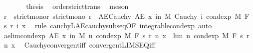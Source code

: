 \begin{isabellebody}
\isanewline
\ \ \ \ \isamarkupfalse%
\ \isamarkupfalse%
\ {\isacharquery}{\kern0pt}thesis\ \isamarkupfalse%
\ order{\isachardot}{\kern0pt}strict{\isacharunderscore}{\kern0pt}trans{}\ \isamarkupfalse%
\ meson\isanewline
\ \ \isamarkupfalse%
\isanewline
\ \ \isamarkupfalse%
\ \isamarkupfalse%
\ r\ \ strict{\isacharunderscore}{\kern0pt}mono{\isacharunderscore}{\kern0pt}r{\isacharcolon}{\kern0pt}\ {\isachardoublequoteopen}strict{\isacharunderscore}{\kern0pt}mono\ r{\isachardoublequoteclose}\ \ AE{\isacharunderscore}{\kern0pt}Cauchy{\isacharcolon}{\kern0pt}\ {\isachardoublequoteopen}AE\ x\ in\ M{\isachardot}{\kern0pt}\ Cauchy\ {\isacharparenleft}{\kern0pt}{\isasymlambda}i{\isachardot}{\kern0pt}\ cond{\isacharunderscore}{\kern0pt}exp\ M\ F\ {\isacharparenleft}{\kern0pt}s\ {\isacharparenleft}{\kern0pt}r\ i{\isacharparenright}{\kern0pt}{\isacharparenright}{\kern0pt}\ x{\isacharparenright}{\kern0pt}{\isachardoublequoteclose}\ \isamarkupfalse%
\ {\isacharparenleft}{\kern0pt}rule\ cauchy{\isacharunderscore}{\kern0pt}L{}{\isacharunderscore}{\kern0pt}AE{\isacharunderscore}{\kern0pt}cauchy{\isacharunderscore}{\kern0pt}subseq{\isacharbrackleft}{\kern0pt}OF\ integrable{\isacharunderscore}{\kern0pt}cond{\isacharunderscore}{\kern0pt}exp{\isacharbrackright}{\kern0pt}{\isacharcomma}{\kern0pt}\ auto{\isacharparenright}{\kern0pt}\isanewline
\ \ \isamarkupfalse%
\ ae{\isacharunderscore}{\kern0pt}lim{\isacharunderscore}{\kern0pt}cond{\isacharunderscore}{\kern0pt}exp{\isacharcolon}{\kern0pt}\ {\isachardoublequoteopen}AE\ x\ in\ M{\isachardot}{\kern0pt}\ {\isacharparenleft}{\kern0pt}{\isasymlambda}n{\isachardot}{\kern0pt}\ cond{\isacharunderscore}{\kern0pt}exp\ M\ F\ {\isacharparenleft}{\kern0pt}s\ {\isacharparenleft}{\kern0pt}r\ n{\isacharparenright}{\kern0pt}{\isacharparenright}{\kern0pt}\ x{\isacharparenright}{\kern0pt}\ {\isasymlonglonglongrightarrow}\ lim\ {\isacharparenleft}{\kern0pt}{\isasymlambda}n{\isachardot}{\kern0pt}\ cond{\isacharunderscore}{\kern0pt}exp\ M\ F\ {\isacharparenleft}{\kern0pt}s\ {\isacharparenleft}{\kern0pt}r\ n{\isacharparenright}{\kern0pt}{\isacharparenright}{\kern0pt}\ x{\isacharparenright}{\kern0pt}{\isachardoublequoteclose}\ \isamarkupfalse%
\ Cauchy{\isacharunderscore}{\kern0pt}convergent{\isacharunderscore}{\kern0pt}iff\ convergent{\isacharunderscore}{\kern0pt}LIMSEQ{\isacharunderscore}{\kern0pt}iff\ \isamarkupfalse%

\end{isabellebody}
